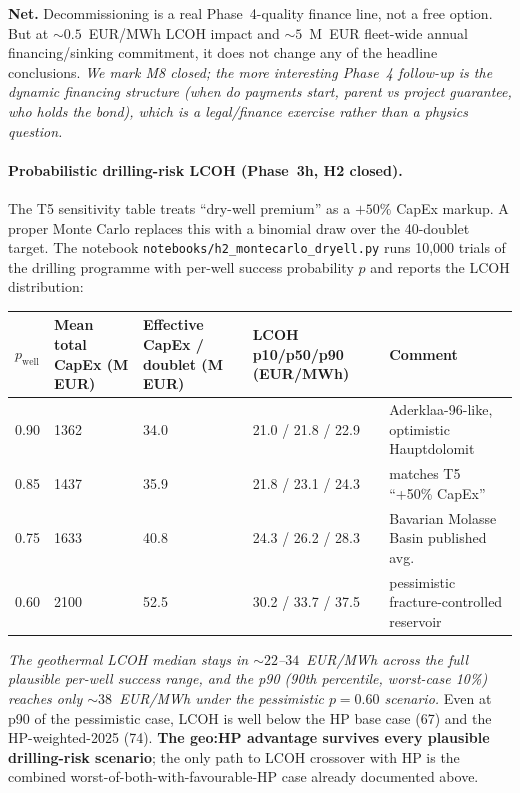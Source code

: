 \documentclass{article}
\begin{document}
\textbf{Net.} Decommissioning is a real Phase~4-quality finance line,
not a free option. But at $\sim 0.5$~EUR/MWh LCOH impact and
$\sim 5$~M~EUR fleet-wide annual financing/sinking commitment, it
does not change any of the headline conclusions. \emph{We mark M8
closed; the more interesting Phase~4 follow-up is the dynamic
financing structure (when do payments start, parent vs project
guarantee, who holds the bond), which is a legal/finance
exercise rather than a physics question.}

\paragraph{Probabilistic drilling-risk LCOH (Phase~3h, H2 closed).}
The T5 sensitivity table treats ``dry-well premium'' as a $+50\%$ CapEx
markup. A proper Monte Carlo replaces this with a binomial draw over
the 40-doublet target. The notebook \texttt{notebooks/h2\_montecarlo\_dryell.py}
runs 10{,}000 trials of the drilling programme with per-well success
probability $p$ and reports the LCOH distribution:

\begin{center}
\begin{tabular}{lllll}
\hline
\textbf{$p_{\mathrm{well}}$} & \textbf{Mean total CapEx (M EUR)} & \textbf{Effective CapEx / doublet (M EUR)} & \textbf{LCOH p10/p50/p90 (EUR/MWh)} & \textbf{Comment} \\
\hline
0.90 & 1362 & 34.0 & 21.0 / 21.8 / 22.9 & Aderklaa-96-like, optimistic Hauptdolomit \\
0.85 & 1437 & 35.9 & 21.8 / 23.1 / 24.3 & matches T5 ``+50\% CapEx'' \\
0.75 & 1633 & 40.8 & 24.3 / 26.2 / 28.3 & Bavarian Molasse Basin published avg.\ \\
0.60 & 2100 & 52.5 & 30.2 / 33.7 / 37.5 & pessimistic fracture-controlled reservoir \\
\hline
\end{tabular}
\end{center}

\emph{The geothermal LCOH median stays in $\sim 22$--$34$~EUR/MWh
across the full plausible per-well success range, and the p90 (90th
percentile, worst-case 10\%) reaches only $\sim 38$~EUR/MWh under the
pessimistic $p=0.60$ scenario.} Even at p90 of the pessimistic case,
LCOH is well below the HP base case (67) and the HP-weighted-2025
(74). \textbf{The geo:HP advantage survives every plausible drilling-risk
scenario}; the only path to LCOH crossover with HP is the combined
worst-of-both-with-favourable-HP case already documented above.
\end{document}
